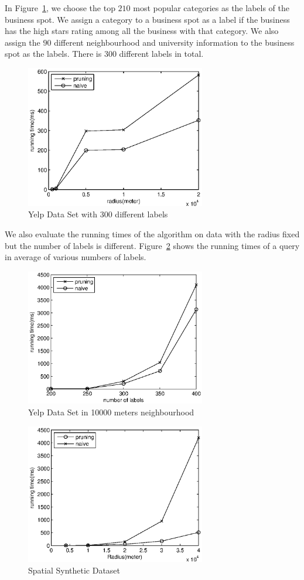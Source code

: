 In Figure~\ref{fig:exp:yelp300l}, we choose the top $210$ most popular categories as the labels of the business spot. We assign a category to a business spot as a label if the business has the high stars rating among all the business with that category. We also assign the $90$ different neighbourhood and university information to the business spot as the labels. There is 300 different labels in total.

\begin{figure}[h]
    \centering
      \includegraphics[width=0.7\textwidth]{figs/Yelp300Labels}
    \caption{\label{fig:exp:yelp300l}Yelp Data Set with 300 different labels}
\end{figure}

We also evaluate the running times of the algorithm on data with the radius fixed but the number of labels is different. Figure~\ref{fig:exp:yelp10k} shows the running times of a query in average of various numbers of labels.

\begin{figure}[h]
    \centering
      \includegraphics[width=0.7\textwidth]{figs/Yelp10Kmeters}
    \caption{\label{fig:exp:yelp10k}Yelp Data Set in 10000 meters neighbourhood}
\end{figure}

\begin{figure}[h]
    \centering
        \includegraphics[width=0.7\textwidth]{figs/Spatial}
    \caption{\label{fig:exp:spatial}Spatial Synthetic Dataset}
\end{figure}